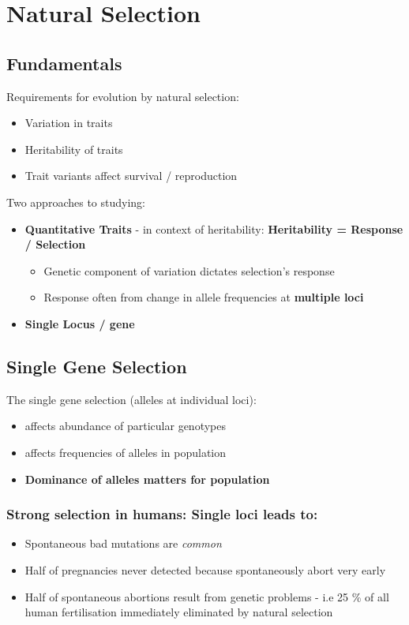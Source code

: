 \documentclass{scrartcl}
\begin{document}
\section{Natural Selection}
\label{sec:07}
\subsection{Fundamentals}
\label{sec:07-01}
Requirements for evolution by natural selection:
\begin{itemize}
\item Variation in traits
\item Heritability of traits
\item Trait variants affect survival / reproduction
\end{itemize}
Two approaches to studying:
\begin{itemize}
\item {\bf Quantitative Traits} - in context of heritability: {\bf Heritability = Response / Selection} 
  \begin{itemize}
  \item Genetic component of variation dictates selection's response
  \item Response often from change in allele frequencies at {\bf multiple loci}
  \end{itemize}
\item {\bf Single Locus / gene} 
\end{itemize}

\subsection{Single Gene Selection}
\label{sec:07-01-01}
The single gene selection (alleles at individual loci):
\begin{itemize}
\item affects abundance of particular genotypes
\item affects frequencies of alleles in population
\item {\bf Dominance of alleles matters for population}
\end{itemize}

\subsubsection{Strong selection in humans: Single loci leads to:}
\label{sec:07-01-02}
\begin{itemize}
\item Spontaneous bad mutations are {\em common}
\item Half of pregnancies never detected because spontaneously abort very early
\item Half of spontaneous abortions result from genetic problems - i.e 25 \% of all human fertilisation immediately eliminated by natural selection
\end{itemize}
\end{document}
